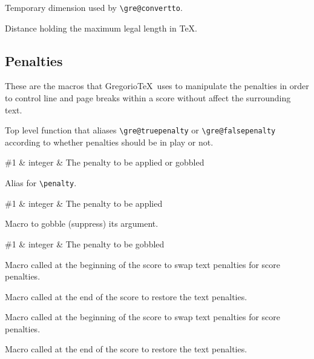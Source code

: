 Temporary dimension used by \verb=\gre@convertto=.

Distance holding the maximum legal length in TeX.


\subsection{Penalties}
These are the macros that Gregorio\TeX\ uses to manipulate the penalties in order to control line and page breaks within a score without affect the surrounding text.

Top level function that aliases \verb=\gre@truepenalty= or \verb=\gre@falsepenalty= according to whether penalties should be in play or not.

\begin{argtable}
  \#1 & integer & The penalty to be applied or gobbled\\
\end{argtable}

Alias for \verb=\penalty=.

\begin{argtable}
  \#1 & integer & The penalty to be applied\\
\end{argtable}

Macro to gobble (suppress) its argument.

\begin{argtable}
  \#1 & integer & The penalty to be gobbled\\
\end{argtable}

Macro called at the beginning of the score to swap text penalties for score penalties.

Macro called at the end of the score to restore the text penalties.

Macro called at the beginning of the score to swap text penalties for score penalties.

Macro called at the end of the score to restore the text penalties.

